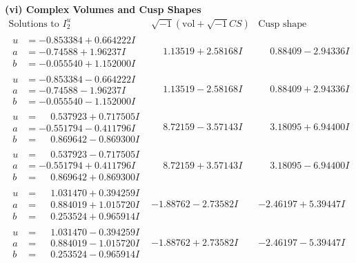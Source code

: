 \documentclass[1p]{elsarticle_modified}
\theoremstyle{definition}
\newcommand{\I}{\sqrt{-1}}
\begin{document}
\newpage\flushleft \textbf{(vi) Complex Volumes and Cusp Shapes}
$$\begin{array}{c|c|c}  
\text{Solutions to }I^u_{2}& \I (\text{vol} + \sqrt{-1}CS) & \text{Cusp shape}\\
 \hline 
\begin{aligned}
u &= -0.853384 + 0.664222 I \\
a &= -0.74588 + 1.96237 I \\
b &= -0.055540 + 1.152000 I\end{aligned}
 & \phantom{-}1.13519 + 2.58168 I & \phantom{-}0.88409 - 2.94336 I \\ \hline\begin{aligned}
u &= -0.853384 - 0.664222 I \\
a &= -0.74588 - 1.96237 I \\
b &= -0.055540 - 1.152000 I\end{aligned}
 & \phantom{-}1.13519 - 2.58168 I & \phantom{-}0.88409 + 2.94336 I \\ \hline\begin{aligned}
u &= \phantom{-}0.537923 + 0.717505 I \\
a &= -0.551794 - 0.411796 I \\
b &= \phantom{-}0.869642 - 0.869300 I\end{aligned}
 & \phantom{-}8.72159 - 3.57143 I & \phantom{-}3.18095 + 6.94400 I \\ \hline\begin{aligned}
u &= \phantom{-}0.537923 - 0.717505 I \\
a &= -0.551794 + 0.411796 I \\
b &= \phantom{-}0.869642 + 0.869300 I\end{aligned}
 & \phantom{-}8.72159 + 3.57143 I & \phantom{-}3.18095 - 6.94400 I \\ \hline\begin{aligned}
u &= \phantom{-}1.031470 + 0.394259 I \\
a &= \phantom{-}0.884019 + 1.015720 I \\
b &= \phantom{-}0.253524 + 0.965914 I\end{aligned}
 & -1.88762 - 2.73582 I & -2.46197 + 5.39447 I \\ \hline\begin{aligned}
u &= \phantom{-}1.031470 - 0.394259 I \\
a &= \phantom{-}0.884019 - 1.015720 I \\
b &= \phantom{-}0.253524 - 0.965914 I\end{aligned}
 & -1.88762 + 2.73582 I & -2.46197 - 5.39447 I \\ \hline\begin{aligned}

\end{aligned}
\end{array}$$
\end{document}
